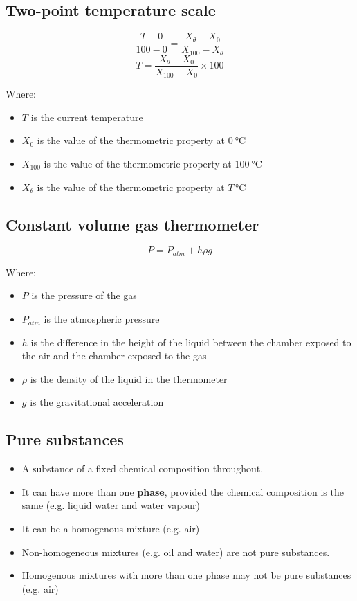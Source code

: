 \documentclass[11pt]{article}
\begin{document}
\subsection{Two-point temperature scale}
\label{sec:org93d49e3}
\[\frac{T - 0}{100 - 0} = \frac{X_\theta - X_0}{X_{100} - X_\theta}\]
\[T = \frac{X_\theta - X_0}{X_{100} - X_0} \times 100\]

Where:
\begin{itemize}
\item \(T\) is the current temperature
\item \(X_0\) is the value of the thermometric property at \(\qty{0}{\degreeCelsius}\)
\item \(X_{100}\) is the value of the thermometric property at \(\qty{100}{\degreeCelsius}\)
\item \(X_\theta\) is the value of the thermometric property at \(T \, \unit{\degreeCelsius}\)
\end{itemize}

\subsection{Constant volume gas thermometer}
\label{sec:org49ae7a7}
\[P = P_{atm} + h \rho g\]

Where:
\begin{itemize}
\item \(P\) is the pressure of the gas
\item \(P_{atm}\) is the atmospheric pressure
\item \(h\) is the difference in the height of the liquid between the chamber exposed to the air and the chamber exposed to the gas
\item \(\rho\) is the density of the liquid in the thermometer
\item \(g\) is the gravitational acceleration
\end{itemize}

\subsection{Pure substances}
\label{sec:org8f74651}
\begin{itemize}
\item A substance of a fixed chemical composition throughout.
\item It can have more than one \textbf{phase}, provided the chemical composition is the same (e.g. liquid water and water vapour)
\item It can be a homogenous mixture (e.g. air)
\item Non-homogeneous mixtures (e.g. oil and water) are not pure substances.
\item Homogenous mixtures with more than one phase may not be pure substances (e.g. air)
\end{itemize}
\end{document}

